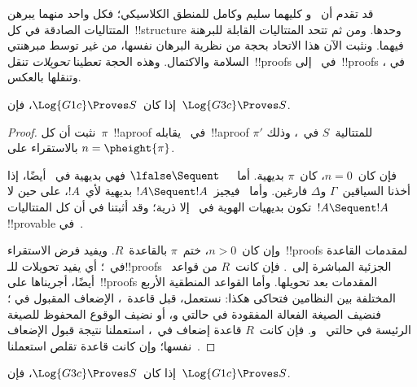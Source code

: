 \documentclass[../../../include/open-logic-section]{subfiles}
\begin{document}


قد تقدم أن~ و كليهما سليم وكامل للمنطق الكلاسيكي؛
فكل واحد منهما يبرهن المتتاليات الصادقة في كل~!!{structure} وحدها. ومن
ثم تتحد المتتاليات القابلة للبرهنة فيهما. ونثبت الآن هذا الاتحاد بحجة
من نظرية البرهان نفسها، من غير توسط مبرهنتي السلامة والاكتمال. وهذه الحجة
تعطينا \emph{تحويلات} تنقل~!!{proof}s في~ إلى~!!{proof}s في
، وتنقلها بالعكس.

\begin{prop}
إذا كان~$\Log{G1c}\Proves S$، فإن~$\Log{G3c}\Proves S$.
\end{prop}

\begin{proof}
  نثبت أن كل~$\pi$~!!a{proof} في~ يقابله~!!a{proof}
  $\pi'$ للمتتالية~$S$ في~، وذلك بالاستقراء على
  $n=\pheight{\pi}$.

  فإن كان~$n=0$، كان~$\pi$ بديهية. أما~$\lfalse\Sequent\quad$ فهي
  بديهية في~ أيضًا، إذا أخذنا السياقين~$\Gamma$ و$\Delta$
  فارغين. وأما~ فيجيز~$!A\Sequent !A$ بديهية لأي~$!A$، على
  حين لا تكون بديهيات الهوية في~ إلا ذرية؛ وقد أثبتنا في
   أن كل المتتاليات~$!A\Sequent !A$
  !!{provable} في~.

  وإن كان~$n>0$، ختم~$\pi$ بالقاعدة~$R$. ويفيد فرض الاستقراء~!!{proof}s
  لمقدمات القاعدة في~؛ أي يفيد تحويلات للـ!!{proof}s الجزئية
  المباشرة إلى~. فإن كانت~$R$ من قواعد~ أيضًا، أجريناها
  على~!!{proof}s المقدمات بعد تحويلها. وأما القواعد المنطقية الأربع المختلفة بين
  النظامين فتحاكى هكذا: نستعمل، قبل قاعدة~، الإضعاف المقبول في
  ؛ فنضيف الصيغة الفعالة المفقودة في حالتي
  \LeftR{\land} و\RightR{\lor}، أو نضيف الوقوع المحفوظ للصيغة الرئيسة
  في حالتي~\LeftR{\lforall} و\RightR{\lexists}. فإن كانت~$R$ قاعدة
  إضعاف في~، استعملنا نتيجة قبول الإضعاف نفسها؛ وإن كانت قاعدة
  تقلص استعملنا~.
\end{proof}

\begin{prop}
إذا كان~$\Log{G3c}\Proves S$، فإن~$\Log{G1c}\Proves S$.
\end{prop}
\end{document}
